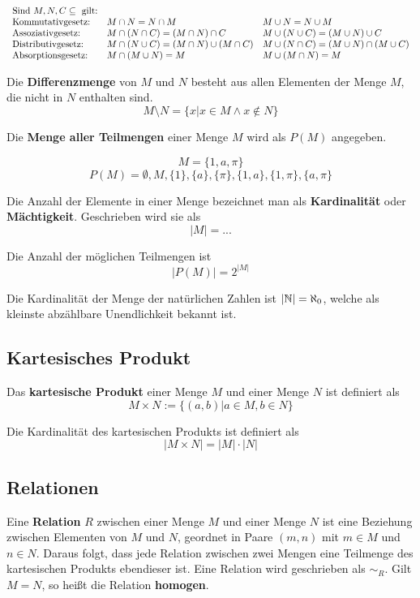 \documentclass[11pt]{article}
\begin{document}
$
  \begin{array}{l l l}
    \text{Sind } M, N, C \subseteq \text{ gilt:}                                                                                    \\
    \text{Kommutativgesetz:}  & M \cap N = N \cap M                            & M \cup N = N \cup M                            \\
    \text{Assoziativgesetz:}  & M \cap (N \cap C) = (M \cap N) \cap C          & M \cup (N \cup C) = (M \cup N) \cup C          \\
    \text{Distributivgesetz:} & M \cap (N \cup C) = (M \cap N) \cup (M \cap C) & M \cup (N \cap C) = (M \cup N) \cap (M \cup C) \\
    \text{Absorptionsgesetz:} & M \cap (M \cup N) = M                          & M \cup (M \cap N) = M                          \\
  \end{array}
$

Die \textbf{Differenzmenge} von $M$ und $N$ besteht aus allen Elementen der Menge $M$, die nicht in $N$ enthalten sind.
\[
  M \setminus N = \{x | x \in M \land x \notin N\}
\]

Die \textbf{Menge aller Teilmengen} einer Menge $M$ wird als $P(M)$ angegeben.

\[
  M = \{1, a, \pi \}
\]
\[
  P(M) = \emptyset, M, \{1\}, \{a\}, \{\pi\}, \{1, a\}, \{1, \pi\}, \{a, \pi\}
\]

Die Anzahl der Elemente in einer Menge bezeichnet man als \textbf{Kardinalität} oder \textbf{Mächtigkeit}. Geschrieben
wird sie als
\[
  |M| = ...
\]

Die Anzahl der möglichen Teilmengen ist
\[
  |P(M)| = 2^{|M|}
\]

\begin{anmk}
  Die Kardinalität der Menge der natürlichen Zahlen ist $|\mathbb{N}| = \aleph_0$, welche als kleinste abzählbare Unendlichkeit
  bekannt ist.
\end{anmk}

\subsection{Kartesisches Produkt}
Das \textbf{kartesische Produkt} einer Menge $M$ und einer Menge $N$ ist definiert als
\[
  M\times N := \{(a,b)|a\in M, b \in N\}
\]

Die Kardinalität des kartesischen Produkts ist definiert als
\[
  |M \times N| = |M| \cdot |N|
\]

\subsection{Relationen}
Eine \textbf{Relation} $R$ zwischen einer Menge $M$ und einer Menge $N$ ist eine Beziehung zwischen Elementen von $M$ und $N$,
geordnet in Paare $(m, n)$ mit $m \in M$ und $n \in N$. Daraus folgt, dass jede Relation zwischen zwei Mengen eine
Teilmenge des kartesischen Produkts ebendieser ist. Eine Relation wird geschrieben als $\sim_R$. Gilt $M = N$, so heißt
die Relation \textbf{homogen}.
\end{document}
